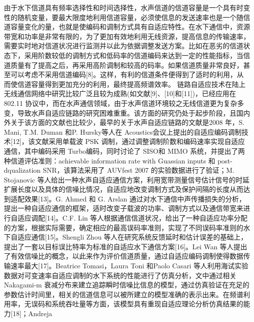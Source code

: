 由于水下信道具有频率选择性和时间选择性，水声信道的信道容量是一个具有时变性的随机变量，要最大限度地利用信道容量，必须使信息的发送速率也是一个随信道容量变化的量，也就是使编码和调制方式具有自适应特性。在水下通信中，资源带宽和功率是非常有限的，为了更加有效地利用无线资源，提高信息的传输速率，需要实时地对信道状况进行监测并以此为依据调整发送方案。比如在恶劣的信道状态下，采用阶数较低的调制方式和低码率的信道编码来达到一定的性能指标，当信道质量有了提高之后，再采用高阶调制和较高的码率。如果信道质量非常良好，甚至可以考虑不采用信道编码[8]。这样，有利的信道条件便得到了适时的利用，从而使信道容量得到更加充分的利用，最终提高频谱效率。 链路自适应技术在陆上无线通信网络中研究比较广泛且较为成熟(如文献[9]、[10]和[11])，已经应用在 802.11 协议中，而在水声通信领域，由于水声信道环境较之无线信道更为复杂多变，导致水声自适应链路的研究困难重重。该方面的研究仍处于起步阶段，且国内外关于该方面的文献也比较少，最早的关于水声自适应链路的文献是2008 年，S. Mani, T.M. Duman  和P. Hursky等人在 Acoustics会议上提出的自适应编码调制技术[12]，该文献采用单载波 PSK 调制，通过调整调制阶数和编码速率实现自适应通信，其中编码采用 Turbo编码，同时讨论了 SISO和 MIMO 系统，并提出了两种信道评估准则：achievable  information rate with Guassian inputs 和 post-dqualization SNR，该算法采用了 AUVfest 2007 的实验数据进行了验证；M. Stojanovic 等人给出一种水声自适应通信方案，利用宽带测量信号估计信号的时延扩展长度以及具体的信噪比情况，自适应地改变调制方式及保护间隔的长度从而达到适配效果[13]。G. Ahmed  和 G. Arslan 通过对水下通信中声传播损失的分析，提出一种自适应通信的框架，适时改变子载波的功率、调制方式以及通信带宽来进行自适应调配[14]。C.F. Lin  等人根据通信信道状况，给出了一种自适应功率分配的方案，根据实际需要，确定相应的最高误码率准则，实现了不同误码率准则的水下自适应通信[15]。Shengli Zhou 等人在研究系统反馈延时和估计误差的基础上，提出了一套以目标误比特率为标准的自适应水下通信方案[16]。Lei Wan  等人提出了有效信噪比的概念，以此来作为评价信道质量，通过自适应编码调制使得数据传输速率最大[17]。Beatrice  Tomasi，Laura  Toni 和Paolo Casari 等人利用海试实验数据对可变速率自适应调制的水下系统的性能进行了仿真分析，文中通过相关 Nakagami-m 衰减分布来建立追踪瞬时信噪比信息的模型，通过仿真验证在充足的参数估计时间里，相关的信道信息可以被所建立的模型准确的表示出来。在频谱利用率，无误码和系统吞吐量等方面，该模型具有重现自适应理论分析仿真结果的能力[18]；Andreja 